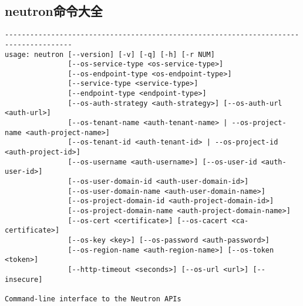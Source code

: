 \documentclass[a4paper,left=1.5cm,right=1.5cm,11pt]{article}
\begin{document}
\subsection{neutron命令大全}
\begin{lstlisting}
--------------------------------------------------------------------------------------
usage: neutron [--version] [-v] [-q] [-h] [-r NUM]
               [--os-service-type <os-service-type>]
               [--os-endpoint-type <os-endpoint-type>]
               [--service-type <service-type>]
               [--endpoint-type <endpoint-type>]
               [--os-auth-strategy <auth-strategy>] [--os-auth-url <auth-url>]
               [--os-tenant-name <auth-tenant-name> | --os-project-name <auth-project-name>]
               [--os-tenant-id <auth-tenant-id> | --os-project-id <auth-project-id>]
               [--os-username <auth-username>] [--os-user-id <auth-user-id>]
               [--os-user-domain-id <auth-user-domain-id>]
               [--os-user-domain-name <auth-user-domain-name>]
               [--os-project-domain-id <auth-project-domain-id>]
               [--os-project-domain-name <auth-project-domain-name>]
               [--os-cert <certificate>] [--os-cacert <ca-certificate>]
               [--os-key <key>] [--os-password <auth-password>]
               [--os-region-name <auth-region-name>] [--os-token <token>]
               [--http-timeout <seconds>] [--os-url <url>] [--insecure]

Command-line interface to the Neutron APIs


\end{lstlisting}
\end{document}
